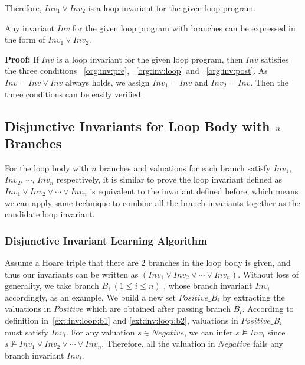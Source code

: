 Therefore, $Inv_1 \vee Inv_2$ is a loop invariant for the given loop program. %

\begin{theorem}
\label{thm:invariant:is:disjunctive}
	Any invariant $Inv$ for the given loop program with branches can be expressed in the form of $Inv_1 \vee Inv_2$.
\end{theorem}

\noindent \textbf{Proof:} If $Inv$ is a loop invariant for the given loop program,
then $Inv$ satisfies the three conditions ~\ref{org:inv:pre}, ~\ref{org:inv:loop} and ~\ref{org:inv:post}.
As $Inv = Inv \vee Inv$ always holds, we assign $Inv_1 = Inv$ and $Inv_2 = Inv$.
Then the three conditions can be easily verified. %

\subsection{Disjunctive Invariants for Loop Body with $\emph{n}$ Branches}
For the loop body with $n$ branches and valuations for each branch satisfy $Inv_1$, $Inv_2$, $\cdots$, $Inv_n$ respectively,
it is similar to prove the loop invariant defined as $Inv_1 \vee Inv_2 \vee \cdots \vee Inv_n$ is equivalent to the invariant defined before,
which means we can apply same technique to combine all the branch invariants together as the candidate loop invariant.

\subsubsection{Disjunctive Invariant Learning Algorithm}
Assume a Hoare triple that there are 2 branches in the loop body is given, 
and thus our invariants can be written as $(Inv_1 \vee Inv_2 \vee \cdots \vee Inv_n)$.
Without loss of generality, we take branch $B_i~(1 \le i \le n)$ , whose branch invariant $Inv_i$ accordingly, as an example.
We build a new set $\mathit{Positive\_B_i}$ by extracting the valuations in $\mathit{Positive}$ which are obtained after passing branch $B_i$.
According to definition in~\ref{ext:inv:loop:b1} and \ref{ext:inv:loop:b2}, 
valuations in $\mathit{Positive\_B_i}$ must satisfy $Inv_i$.
For any valuation $s \in \mathit{Negative}$, 
we can infer $s \not \models Inv_i$ since $s \not \models Inv_1 \vee Inv_2 \vee \cdots \vee Inv_n$.
Therefore, all the valuation in $\mathit{Negative}$ fails any branch invariant $Inv_i $.

